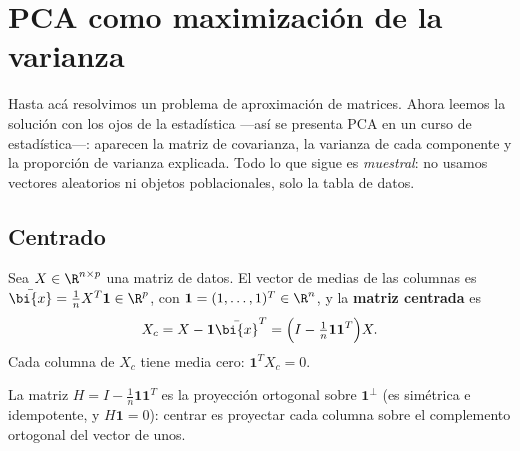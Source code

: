 \section{PCA como maximización de la varianza}\label{pca-sec:varianza}

Hasta acá resolvimos un problema de aproximación de matrices. Ahora leemos
la solución con los ojos de la estadística ---así se presenta PCA en un curso
de estadística---: aparecen la matriz de covarianza, la varianza de cada
componente y la proporción de varianza explicada. Todo lo que sigue es
\emph{muestral}: no usamos vectores aleatorios ni objetos poblacionales, solo
la tabla de datos.

\subsection{Centrado}

\begin{definition}
Sea $X\in\R^{n\times p}$ una matriz de datos. El vector de medias de las
columnas es $\bar{\bi{x}}=\tfrac1n X^T\mathbf 1\in\R^p$, con
$\mathbf 1=(1,\dots,1)^T\in\R^n$, y la \textbf{matriz centrada} es
\[
X_c=X-\mathbf 1\bar{\bi{x}}^T=\Bigl(I-\tfrac1n\mathbf 1\mathbf 1^T\Bigr)X .
\]
Cada columna de $X_c$ tiene media cero: $\mathbf 1^T X_c=0$.
\end{definition}

La matriz $H=I-\frac1n\mathbf 1\mathbf 1^T$ es la proyección ortogonal
sobre $\mathbf 1^\perp$ (es simétrica e idempotente, y $H\mathbf 1=0$): centrar
es proyectar cada columna sobre el complemento ortogonal del vector de unos.

